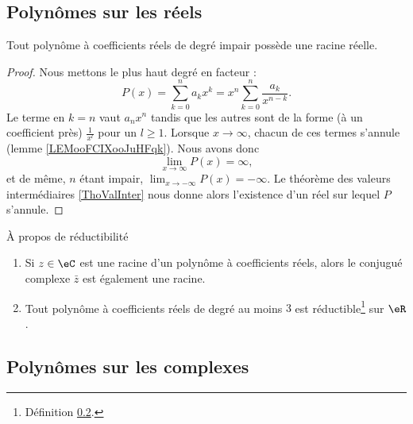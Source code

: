 \subsection{Polynômes sur les réels}

\begin{proposition}     \label{PROPooJKYJooFqbQMr}
	Tout polynôme à coefficients réels de degré impair possède une racine réelle.
\end{proposition}

\begin{proof}
	Nous mettons le plus haut degré en facteur :
	\begin{equation}
		P(x)=\sum_{k=0}^na_kx^k=x^n\sum_{k=0}^n\frac{ a_k }{ x^{n-k} }.
	\end{equation}
	Le terme en \( k=n\) vaut \( a_nx^n\) tandis que les autres sont de la forme (à un coefficient près) \( \frac{1}{ x^l }\) pour un \( l\geq 1\). Lorsque \( x\to \infty\), chacun de ces termes s'annule (lemme \ref{LEMooFCIXooJuHFqk}). Nous avons donc
	\begin{equation}
		\lim_{x\to \infty} P(x)=\infty,
	\end{equation}
	et de même, \( n\) étant impair, \( \lim_{x\to -\infty} P(x)=-\infty\). Le théorème des valeurs intermédiaires \ref{ThoValInter} nous donne alors l'existence d'un réel sur lequel \( P\) s'annule.
\end{proof}

\begin{proposition}	\label{PROPooARLAooMNnNsz}
	À propos de réductibilité
	\begin{enumerate}
		\item
		      Si \( z\in \eC\) est une racine d'un polynôme à coefficients réels, alors le conjugué complexe \( \bar z\) est également une racine.
		\item
		      Tout polynôme à coefficients réels de degré au moins \( 3\) est réductible\footnote{Définition \ref{}.} sur \( \eR\).
	\end{enumerate}
\end{proposition}


\subsection{Polynômes sur les complexes}

